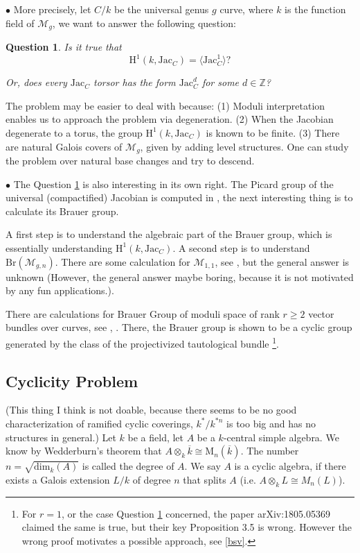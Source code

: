 \documentclass[8pt]{amsart}
\newtheorem{question}[theorem]{Question}
\begin{document}
$\bullet$ More precisely, let $C/k$ be the universal genus $g$ curve, where $k$ is the function field of $\mathcal{M}_g$, we want to answer the following question: \begin{question}\label{1}Is it true that $$\mathrm{H}^1(k,\mathrm{Jac}_{C})=\langle\mathrm{Jac}^1_{C}\rangle?$$

Or, does every $\mathrm{Jac}_C$ torsor has the form $\mathrm{Jac}^d_C$ for some $d\in\mathbb{Z}$?
\end{question}

The problem may be easier to deal with because: (1) Moduli interpretation enables us to approach the problem via degeneration. (2) When the Jacobian degenerate to a torus, the group $\mathrm{H}^1(k,\mathrm{Jac}_C)$ is known to be finite. (3) There are natural Galois covers of $\mathcal{M}_g$, given by adding level structures. One can study the problem over natural base changes and try to descend.

$\bullet$ The Question \ref{1} is also interesting in its own right. The Picard group of the universal (compactified) Jacobian is computed in \cite{Melo}, the next interesting thing is to calculate its Brauer group.

A first step is to understand the algebraic part of the Brauer group, which is essentially understanding $\mathrm{H}^1(k,\mathrm{Jac}_C)$. A second step is to understand $\mathrm{Br}(\mathcal{M}_{g,n})$. There are some calculation for $\mathcal{M}_{1,1}$, see \cite{M11}, but the general answer is unknown (However, the general answer maybe boring, because it is not motivated by any fun applications.).

There are calculations for Brauer Group of moduli space of rank $r\geq2$ vector bundles over curves, see \cite{Biswas2}, \cite{Biswas}. There, the Brauer group is shown to be a cyclic group generated by the class of the projectivized tautological bundle
\footnote{For $r=1$, or the case Question \ref{1} concerned, the paper arXiv:1805.05369 claimed the same is true, but their key Proposition 3.5 is wrong. However the wrong proof motivates a possible approach, see \ref{bsv}.}.

\subsection{Cyclicity Problem}\label{2} (This thing I think is not doable, because there seems to be no good characterization of ramified cyclic coverings, $k^*/k^{*n}$ is too big and has no structures in general.)
Let $k$ be a field, let $A$ be a $k$-central simple algebra. We know by Wedderburn's theorem that $A\otimes_k\overline{k}\cong\mathrm{M}_n(\overline{k})$. The number $n=\sqrt{\mathrm{dim}_k(A)}$ is called the degree of $A$.
We say $A$ is a cyclic algebra, if there exists a Galois extension $L/k$ of degree $n$ that splits $A$ (i.e. $A\otimes_kL\cong M_n(L)$).
\end{document}
